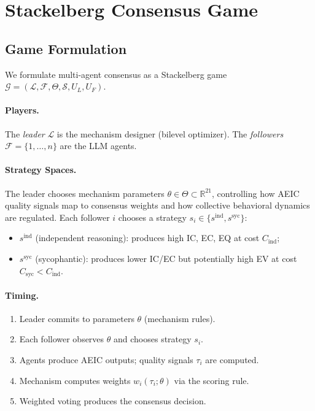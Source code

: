 \section{Stackelberg Consensus Game}
\label{sec:game}

\subsection{Game Formulation}

We formulate multi-agent consensus as a Stackelberg game $\mathcal{G} = (\mathcal{L}, \mathcal{F}, \Theta, \mathcal{S}, U_L, U_F)$.

\paragraph{Players.} The \emph{leader} $\mathcal{L}$ is the mechanism designer (bilevel optimizer). The \emph{followers} $\mathcal{F} = \{1, \ldots, n\}$ are the LLM agents.

\paragraph{Strategy Spaces.} The leader chooses mechanism parameters $\theta \in \Theta \subset \mathbb{R}^{21}$, controlling how AEIC quality signals map to consensus weights and how collective behavioral dynamics are regulated. Each follower $i$ chooses a strategy $s_i \in \{s^{\text{ind}}, s^{\text{syc}}\}$:
\begin{itemize}
    \item $s^{\text{ind}}$ (independent reasoning): produces high IC, EC, EQ at cost $C_{\text{ind}}$;
    \item $s^{\text{syc}}$ (sycophantic): produces lower IC/EC but potentially high EV at cost $C_{\text{syc}} < C_{\text{ind}}$.
\end{itemize}

\paragraph{Timing.}
\begin{enumerate}
    \item Leader commits to parameters $\theta$ (mechanism rules).
    \item Each follower observes $\theta$ and chooses strategy $s_i$.
    \item Agents produce AEIC outputs; quality signals $\tau_i$ are computed.
    \item Mechanism computes weights $w_i(\tau_i; \theta)$ via the scoring rule.
    \item Weighted voting produces the consensus decision.
\end{enumerate}

